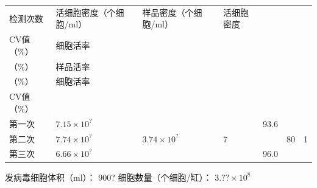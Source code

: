 \documentclass[UTF8,10pt,a4paper,fontset=fandol]{ctexart}
\renewcommand{\arraystretch}{1.15}
\newcommand{\fieldvalue}[1]{#1}
\newcommand{\handwritten}[1]{#1}
\begin{document}
\small
\renewcommand{\arraystretch}{1.35}
\begin{tabular}{|p{1.2cm}|p{2.65cm}|p{2.35cm}|p{1.7cm}|p{1.45cm}|p{1.45cm}|p{1.65cm}|}
\hline
检测次数 &
活细胞密度（个细胞/ml） &
样品密度（个细胞/ml） &
活细胞密度\\CV值（\%） &
细胞活率\\（\%） &
样品活率\\（\%） &
细胞活率\\CV值（\%）\\
\hline
第一次 &
$\fieldvalue{\handwritten{7.15\times10^{?}}}$ &
&
&
\fieldvalue{\handwritten{93.6}} &
&\\
\hline
第二次 &
$\fieldvalue{\handwritten{7.74\times10^{?}}}$ &
$\fieldvalue{\handwritten{3.74\times10^{?}}}$ &
\fieldvalue{\handwritten{7}} &
&
\fieldvalue{\handwritten{80}} &
\fieldvalue{\handwritten{1}}\\
\hline
第三次 &
$\fieldvalue{\handwritten{6.66\times10^{?}}}$ &
&
&
\fieldvalue{\handwritten{96.0}} &
&\\
\hline
\end{tabular}
\normalsize

\vspace{0.5em}

\noindent
发病毒细胞体积（ml）：
\fieldvalue{\handwritten{900?}}
\hfill
细胞数量（个细胞/缸）：
$\fieldvalue{\handwritten{3.??\times10^{8}}}$

\vspace{0.5em}
\end{document}
